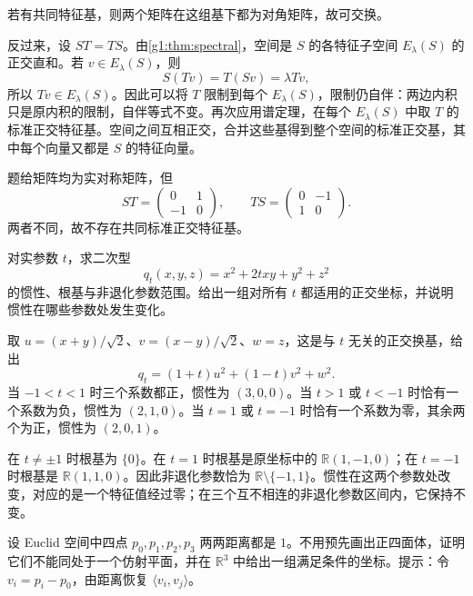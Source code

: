 \begin{solution}
	若有共同特征基，则两个矩阵在这组基下都为对角矩阵，故可交换。

	反过来，设 \(ST=TS\)。由\cref{g1:thm:spectral}，空间是 \(S\) 的各特征子空间 \(E_\lambda(S)\) 的正交直和。若 \(v\in E_\lambda(S)\)，则
	\[
		S(Tv)=T(Sv)=\lambda Tv,
	\]
	所以 \(Tv\in E_\lambda(S)\)。因此可以将 \(T\) 限制到每个 \(E_\lambda(S)\)，限制仍自伴：两边内积只是原内积的限制，自伴等式不变。再次应用谱定理，在每个 \(E_\lambda(S)\) 中取 \(T\) 的标准正交特征基。空间之间互相正交，合并这些基得到整个空间的标准正交基，其中每个向量又都是 \(S\) 的特征向量。

	题给矩阵均为实对称矩阵，但
	\[
		ST=\begin{pmatrix}0&1\\-1&0\end{pmatrix},\qquad
		TS=\begin{pmatrix}0&-1\\1&0\end{pmatrix}.
	\]
	两者不同，故不存在共同标准正交特征基。
\end{solution}

\begin{exercise}
	\label{g1:ex:inertia-family}
	对实参数 \(t\)，求二次型
	\[
		q_t(x,y,z)=x^2+2txy+y^2+z^2
	\]
	的惯性、根基与非退化参数范围。给出一组对所有 \(t\) 都适用的正交坐标，并说明惯性在哪些参数处发生变化。
\end{exercise}

\begin{solution}
	取 \(u=(x+y)/\sqrt2\)、\(v=(x-y)/\sqrt2\)、\(w=z\)，这是与 \(t\) 无关的正交换基，给出
	\[
		q_t=(1+t)u^2+(1-t)v^2+w^2.
	\]
	当 \(-1<t<1\) 时三个系数都正，惯性为 \((3,0,0)\)。当 \(t>1\) 或 \(t<-1\) 时恰有一个系数为负，惯性为 \((2,1,0)\)。当 \(t=1\) 或 \(t=-1\) 时恰有一个系数为零，其余两个为正，惯性为 \((2,0,1)\)。

	在 \(t\ne\pm1\) 时根基为 \(\{0\}\)。在 \(t=1\) 时根基是原坐标中的 \(\mathbb R(1,-1,0)\)；在 \(t=-1\) 时根基是 \(\mathbb R(1,1,0)\)。因此非退化参数恰为 \(\mathbb R\setminus\{-1,1\}\)。惯性在这两个参数处改变，对应的是一个特征值经过零；在三个互不相连的非退化参数区间内，它保持不变。
\end{solution}

\begin{exercise}
	\label{g1:ex:equidistant-four-points}
	设 Euclid 空间中四点 \(p_0,p_1,p_2,p_3\) 两两距离都是 \(1\)。不用预先画出正四面体，证明它们不能同处于一个仿射平面，并在 \(\mathbb R^3\) 中给出一组满足条件的坐标。提示：令 \(v_i=p_i-p_0\)，由距离恢复 \(\langle v_i,v_j\rangle\)。
\end{exercise}

